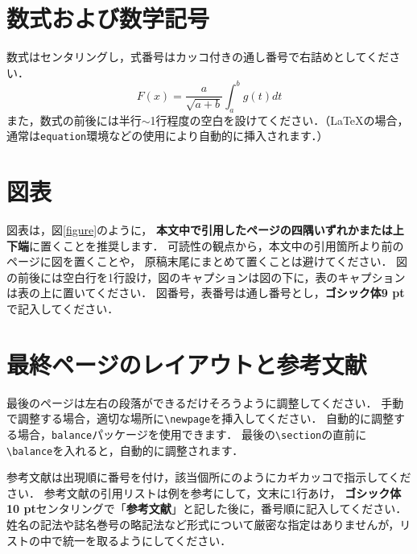 \documentclass[a4paper]{jarticle}
\begin{document}
\section{数式および数学記号}%

数式はセンタリングし，式番号はカッコ付きの通し番号で右詰めとしてください．
\begin{equation}
  F(x) = \frac{a}{\sqrt{a+b}}\int_a^b{g(t)}dt
\end{equation}
また，数式の前後には半行$\sim$1行程度の空白を設けてください．（\LaTeX の場合，
通常は\verb+equation+環境などの使用により自動的に挿入されます．）

\section{図表}%

図表は，図\ref{figure}のように，
{\bf 本文中で引用したページの四隅いずれかまたは上下端}に置くことを推奨します．
可読性の観点から，本文中の引用箇所より前のページに図を置くことや，
原稿末尾にまとめて置くことは避けてください．
図の前後には空白行を1行設け，図のキャプションは図の下に，表のキャプションは表の上に置いてください．
図番号，表番号は通し番号とし，{\bf ゴシック体9 pt}で記入してください．


\section{最終ページのレイアウトと参考文献}

最後のページは左右の段落ができるだけそろうように調整してください．
手動で調整する場合，適切な場所に\verb+\newpage+を挿入してください．
自動的に調整する場合，\verb+balance+パッケージを使用できます．
最後の\verb+\section+の直前に\verb+\balance+を入れると，自動的に調整されます．

参考文献は出現順に番号を付け，該当個所に\cite{bib01}\cite{bib02}\cite{bib03}\cite{bib04}のようにカギカッコで指示してください．
参考文献の引用リストは例を参考にして，文末に1行あけ，
{\normalsize\bf ゴシック体10 pt}センタリングで「{\normalsize\bf 参考文献}」と記した後に，番号順に記入してください．
姓名の記法や誌名巻号の略記法など形式について厳密な指定はありませんが，リストの中で統一を取るようにしてください．
\end{document}
